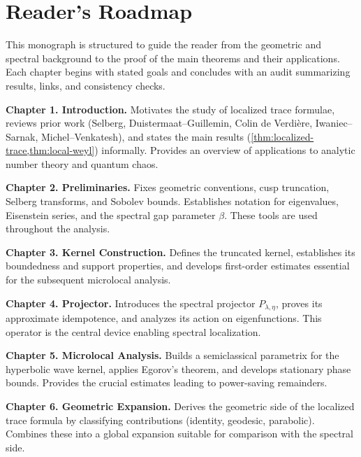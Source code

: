 \section*{Reader's Roadmap}

This monograph is structured to guide the reader from the geometric
and spectral background to the proof of the main theorems and their
applications. Each chapter begins with stated goals and concludes
with an audit summarizing results, links, and consistency checks.

\medskip

\noindent \textbf{Chapter 1. Introduction.}
Motivates the study of localized trace formulae, reviews prior work
(Selberg, Duistermaat–Guillemin, Colin de Verdière, Iwaniec–Sarnak,
Michel–Venkatesh), and states the main results
(\cref{thm:localized-trace,thm:local-weyl}) informally.
Provides an overview of applications to analytic number theory and
quantum chaos.

\medskip

\noindent \textbf{Chapter 2. Preliminaries.}
Fixes geometric conventions, cusp truncation, Selberg transforms, and
Sobolev bounds. Establishes notation for eigenvalues, Eisenstein
series, and the spectral gap parameter $\beta$. These tools are used
throughout the analysis.

\medskip

\noindent \textbf{Chapter 3. Kernel Construction.}
Defines the truncated kernel, establishes its boundedness and support
properties, and develops first-order estimates essential for the
subsequent microlocal analysis.

\medskip

\noindent \textbf{Chapter 4. Projector.}
Introduces the spectral projector $P_{\lambda,\eta}$, proves its
approximate idempotence, and analyzes its action on eigenfunctions.
This operator is the central device enabling spectral localization.

\medskip

\noindent \textbf{Chapter 5. Microlocal Analysis.}
Builds a semiclassical parametrix for the hyperbolic wave kernel,
applies Egorov’s theorem, and develops stationary phase bounds.
Provides the crucial estimates leading to power-saving remainders.

\medskip

\noindent \textbf{Chapter 6. Geometric Expansion.}
Derives the geometric side of the localized trace formula by
classifying contributions (identity, geodesic, parabolic). Combines
these into a global expansion suitable for comparison with the
spectral side.

